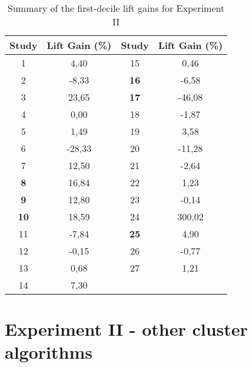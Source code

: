 \begin{table}[h]
\centering
\begin{tabular}{|c|c|c|c|}
\hline
\textbf{Study} & \textbf{Lift Gain (\%)}        & \textbf{Study} & \textbf{Lift Gain (\%)}        \\ \hline
1              & \cellcolor[HTML]{8ed08e}4,40   & 15             & \cellcolor[HTML]{8ed08e}0,46   \\ \hline
2              & \cellcolor[HTML]{ff514d}-8,33  & \textbf{16}    & \cellcolor[HTML]{ff514d}-6,58  \\ \hline
3              & \cellcolor[HTML]{8ed08e}23,65  & \textbf{17}    & \cellcolor[HTML]{ffce93}-46,08 \\ \hline
4              & 0,00                           & 18             & \cellcolor[HTML]{ffccc9}-1,87  \\ \hline
5              & \cellcolor[HTML]{8ed08e}1,49   & 19             & \cellcolor[HTML]{8ed08e}3,58   \\ \hline
6              & \cellcolor[HTML]{ffce93}-28,33 & 20             & \cellcolor[HTML]{ff514d}-11,28 \\ \hline
7              & \cellcolor[HTML]{8ed08e}12,50  & 21             & \cellcolor[HTML]{ffccc9}-2,64  \\ \hline
\textbf{8}     & \cellcolor[HTML]{8ed08e}16,84  & 22             & \cellcolor[HTML]{8ed08e}1,23   \\ \hline
\textbf{9}     & \cellcolor[HTML]{8ed08e}12,80  & 23             & \cellcolor[HTML]{ffccc9}-0,14  \\ \hline
\textbf{10}    & \cellcolor[HTML]{8ed08e}18,59  & 24             & \cellcolor[HTML]{ffce93}300,02 \\ \hline
11             & \cellcolor[HTML]{ff514d}-7,84  & \textbf{25}    & \cellcolor[HTML]{8ed08e}4,90   \\ \hline
12             & \cellcolor[HTML]{ffccc9}-0,15  & 26             & \cellcolor[HTML]{ffccc9}-0,77  \\ \hline
13             & \cellcolor[HTML]{8ed08e}0,68   & 27             & \cellcolor[HTML]{8ed08e}1,21   \\ \hline
14             & \cellcolor[HTML]{8ed08e}7,30   &                &                                \\ \hline
\end{tabular}
\caption{Summary of the first-decile lift gains for Experiment II}
\label{table:lift_gain_exp-ii}
\end{table}

\section{Experiment II - other cluster algorithms}
